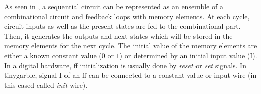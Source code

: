 As seen in , a sequential circuit can be represented as an ensemble of a combinational circuit and feedback loops with memory elements.
At each cycle, circuit inputs as well as the present states are fed to the combinational part.
Then, it generates the outputs and next states which will be stored in the memory elements for the next cycle.
The initial value of the memory elements are either a known constant value ($0$ or $1$) or determined by an initial input value (I).
In a digital hardware, \acrshort{ff} initialization is usually done by \emph{reset} or \emph{set} signals.
In \gls{tinygarble}, signal I of an \acrshort{ff} can be connected to a constant value or input wire (in this cased called \emph{init} wire).
